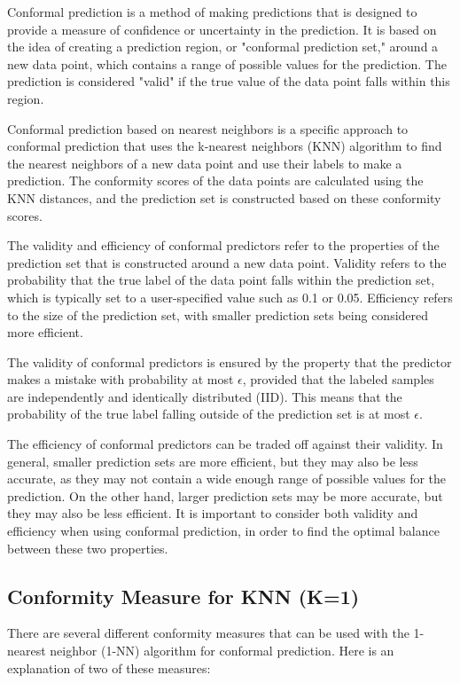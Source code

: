 \documentclass{article}
\theoremstyle{mytheoremstyle}
\theoremstyle{mytheoremstyle}
\theoremstyle{myproblemstyle}
\begin{document}
Conformal prediction is a method of making predictions that is designed to provide a measure of confidence or uncertainty in the prediction. It is based on the idea of creating a prediction region, or "conformal prediction set," around a new data point, which contains a range of possible values for the prediction. The prediction is considered "valid" if the true value of the data point falls within this region.

Conformal prediction based on nearest neighbors is a specific approach to conformal prediction that uses the k-nearest neighbors (KNN) algorithm to find the nearest neighbors of a new data point and use their labels to make a prediction. The conformity scores of the data points are calculated using the KNN distances, and the prediction set is constructed based on these conformity scores.

The validity and efficiency of conformal predictors refer to the properties of the prediction set that is constructed around a new data point. Validity refers to the probability that the true label of the data point falls within the prediction set, which is typically set to a user-specified value such as 0.1 or 0.05. Efficiency refers to the size of the prediction set, with smaller prediction sets being considered more efficient.

The validity of conformal predictors is ensured by the property that the predictor makes a mistake with probability at most $\epsilon$, provided that the labeled samples are independently and identically distributed (IID). This means that the probability of the true label falling outside of the prediction set is at most $\epsilon$.

The efficiency of conformal predictors can be traded off against their validity. In general, smaller prediction sets are more efficient, but they may also be less accurate, as they may not contain a wide enough range of possible values for the prediction. On the other hand, larger prediction sets may be more accurate, but they may also be less efficient. It is important to consider both validity and efficiency when using conformal prediction, in order to find the optimal balance between these two properties.


\subsection{Conformity Measure for KNN (K=1)}
There are several different conformity measures that can be used with the 1-nearest neighbor (1-NN) algorithm for conformal prediction. Here is an explanation of two of these measures:
\end{document}
